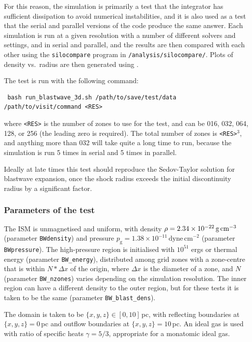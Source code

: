 \documentclass[a4paper,11pt]{report}
\begin{document}
For this reason, the simulation is primarily a test that the integrator has sufficient dissipation to avoid numerical instabilities, and it is also used as a test that the serial and parallel versions of the code produce the same answer.
Each simulation is run at a given resolution with a number of different solvers and settings, and in serial and parallel, and the results are then compared with each other using the \lstinline|silocompare| program in \lstinline|/analysis/silocompare/|.
Plots of density vs.~radius are then generated using \visit{}.

The test is run with the following command:
\begin{lstlisting}
 bash run_blastwave_3d.sh /path/to/save/test/data /path/to/visit/command <RES>
\end{lstlisting}
where \lstinline|<RES>| is the number of zones to use for the test, and can be 016, 032, 064, 128, or 256 (the leading zero is required).
The total number of zones is \lstinline|<RES>|$^3$, and anything more than 032 will take quite a long time to run, because the simulation is run 5 times in serial and 5 times in parallel.

Ideally at late times this test should reproduce the Sedov-Taylor solution for blastwave expansion, once the shock radius exceeds the initial discontinuity radius by a significant factor.

\subsubsection{Parameters of the test}
The ISM is unmagnetised and uniform, with density $\rho=2.34\times10^{-22}\,\mathrm{g}\,\mathrm{cm}^{-3}$ (parameter \lstinline|BWdensity|) and pressure $p_\mathrm{g}=1.38\times10^{-11}\,\mathrm{dyne\,cm}^{-2}$ (parameter \lstinline|BWpressure|).
The high-pressure region is initialised with $10^{51}$ ergs or thermal energy (parameter \lstinline|BW_energy|), distributed among grid zones with a zone-centre that is within $N*\Delta x$ of the origin, where $\Delta x$ is the diameter of a zone, and $N$ (parameter \lstinline|BW_nzones|) varies depending on the simulation resolution.
The inner region can have a different density to the outer region, but for these tests it is taken to be the same (parameter \lstinline|BW_blast_dens|).

The domain is taken to be $\{x,y,z\} \in [0,10]$\,pc, with reflecting boundaries at $\{x,y,z\}=0$\,pc and outflow boundaries at $\{x,y,z\}=10$\,pc.
An ideal gas is used with ratio of specific heats $\gamma=5/3$, appropriate for a monatomic ideal gas.
\end{document}
